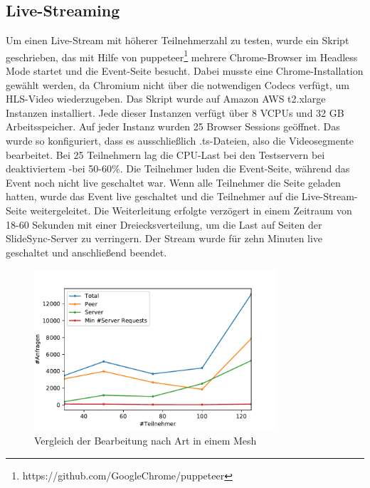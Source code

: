 \subsection{Live-Streaming}
Um einen Live-Stream mit höherer Teilnehmerzahl zu testen, wurde ein Skript geschrieben, das mit Hilfe von puppeteer\footnote{https://github.com/GoogleChrome/puppeteer} mehrere Chrome-Browser im Headless Mode startet und die Event-Seite besucht. Dabei musste eine Chrome-Installation gewählt werden, da Chromium nicht über die notwendigen Codecs verfügt, um HLS-Video wiederzugeben. 
Das Skript wurde auf Amazon AWS t2.xlarge Instanzen installiert. Jede dieser Instanzen verfügt über 8 VCPUs und 32 GB Arbeitsspeicher. Auf jeder Instanz wurden 25 Browser Sessions geöffnet.  Das \cdn wurde so konfiguriert, dass es ausschließlich .ts-Dateien, also die Videosegmente bearbeitet. Bei 25 Teilnehmern lag die CPU-Last bei den Testservern bei deaktiviertem \pTp-\cdn bei 50-60\%. 
Die Teilnehmer luden die Event-Seite, während das Event noch nicht live geschaltet war. Wenn alle Teilnehmer die Seite geladen hatten, wurde das Event live geschaltet und die Teilnehmer auf die Live-Stream-Seite weitergeleitet. Die Weiterleitung erfolgte verzögert in einem Zeitraum von 18-60 Sekunden mit einer Dreiecksverteilung, um die Last auf Seiten der SlideSync-Server zu verringern. Der Stream wurde für zehn Minuten live geschaltet und anschließend beendet.

\begin{figure}[!h]
	\centering
	\includegraphics[width=0.8\textwidth]{figures/single_mesh_line}
	\caption[Vergleich der Bearbeitung nach Art in einem Mesh]{Vergleich der Bearbeitung nach Art in einem Mesh}
	\label{fig:single_mesh_line}
\end{figure}

